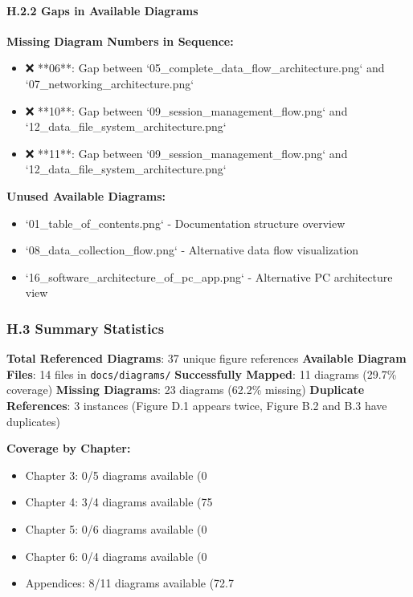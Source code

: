 \documentclass[12pt,a4paper]{article}
\begin{document}
{{\paragraph{H.2.2 Gaps in Available Diagrams}

\textbf{Missing Diagram Numbers in Sequence:}

\begin{itemize}
\item ❌ **06**: Gap between `05_complete_data_flow_architecture.png` and `07_networking_architecture.png`
\item ❌ **10**: Gap between `09_session_management_flow.png` and `12_data_file_system_architecture.png`
\item ❌ **11**: Gap between `09_session_management_flow.png` and `12_data_file_system_architecture.png`

\end{itemize}
\textbf{Unused Available Diagrams:}

\begin{itemize}
\item `01_table_of_contents.png` - Documentation structure overview
\item `08_data_collection_flow.png` - Alternative data flow visualization
\item `16_software_architecture_of_pc_app.png` - Alternative PC architecture view

\end{itemize}
\subsubsection{H.3 Summary Statistics}

\textbf{Total Referenced Diagrams}: 37 unique figure references
\textbf{Available Diagram Files}: 14 files in \texttt{docs/diagrams/}
\textbf{Successfully Mapped}: 11 diagrams (29.7\% coverage)
\textbf{Missing Diagrams}: 23 diagrams (62.2\% missing)
\textbf{Duplicate References}: 3 instances (Figure D.1 appears twice, Figure B.2 and B.3 have duplicates)

\textbf{Coverage by Chapter:}

\begin{itemize}
\item Chapter 3: 0/5 diagrams available (0%
\item Chapter 4: 3/4 diagrams available (75%
\item Chapter 5: 0/6 diagrams available (0%
\item Chapter 6: 0/4 diagrams available (0%
\item Appendices: 8/11 diagrams available (72.7%


\end{itemize}}}
\end{document}
